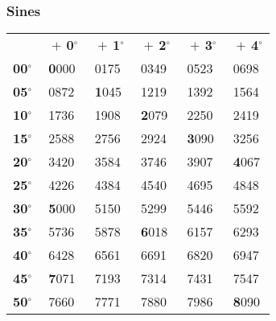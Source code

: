 \documentclass[11pt]{article}
\begin{document}
    \begin{center}
        \subsubsection*{Sines}
        \vspace{-0.35em}
        \footnotesize
        \def\arraystretch{0.95}
        \begin{tabular}{clllll}
            \rowcolor{CELL} \cellcolor{white}{\scriptsize\textbf{sin}} &\textbf{$\;+\,$0$\boldsymbol{^{\circ}}$} &\textbf{$\;+\,$1$\boldsymbol{^{\circ}}$} &\textbf{$\;+\,$2$\boldsymbol{^{\circ}}$} &\textbf{$\;+\,$3$\boldsymbol{^{\circ}}$} &\textbf{$\;+\,$4$\boldsymbol{^{\circ}}$} \\\rowcolor{ROW}
            \cellcolor{CELL}\textbf{00$\boldsymbol{^{\circ}}$} & $\;$\textbf{0}000 & $\;$0175 & $\;$0349 & $\;$0523 & $\;$0698 \\ \rowcolor{ROW}
            \cellcolor{CELL}\textbf{05$\boldsymbol{^{\circ}}$} & $\;$0872 & $\;$\textbf{1}045 & $\;$1219 & $\;$1392 & $\;$1564 \\
            \cellcolor{CELL}\textbf{10$\boldsymbol{^{\circ}}$} & $\;$1736 & $\;$1908 & $\;$\textbf{2}079 & $\;$2250 & $\;$2419 \\
            \cellcolor{CELL}\textbf{15$\boldsymbol{^{\circ}}$} & $\;$2588 & $\;$2756 & $\;$2924 & $\;$\textbf{3}090 & $\;$3256 \\ \rowcolor{ROW}
            \cellcolor{CELL}\textbf{20$\boldsymbol{^{\circ}}$} & $\;$3420 & $\;$3584 & $\;$3746 & $\;$3907 & $\;$\textbf{4}067 \\ \rowcolor{ROW}
            \cellcolor{CELL}\textbf{25$\boldsymbol{^{\circ}}$} & $\;$4226 & $\;$4384 & $\;$4540 & $\;$4695 & $\;$4848 \\
            \cellcolor{CELL}\textbf{30$\boldsymbol{^{\circ}}$} & $\;$\textbf{5}000 & $\;$5150 & $\;$5299 & $\;$5446 & $\;$5592 \\
            \cellcolor{CELL}\textbf{35$\boldsymbol{^{\circ}}$} & $\;$5736 & $\;$5878 & $\;$\textbf{6}018 & $\;$6157 & $\;$6293 \\ \rowcolor{ROW}
            \cellcolor{CELL}\textbf{40$\boldsymbol{^{\circ}}$} & $\;$6428 & $\;$6561 & $\;$6691 & $\;$6820 & $\;$6947 \\ \rowcolor{ROW}
            \cellcolor{CELL}\textbf{45$\boldsymbol{^{\circ}}$} & $\;$\textbf{7}071 & $\;$7193 & $\;$7314 & $\;$7431 & $\;$7547 \\
            \cellcolor{CELL}\textbf{50$\boldsymbol{^{\circ}}$} & $\;$7660 & $\;$7771 & $\;$7880 & $\;$7986 & $\;$\textbf{8}090 \\

\end{tabular}
\end{center}
\end{document}
